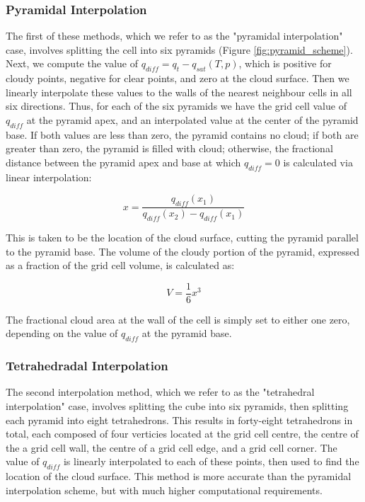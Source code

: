 \documentclass[12pt]{article}
\begin{document}
\subsubsection{Pyramidal Interpolation}

The first of these methods, which we refer to as the "pyramidal interpolation" 
case, involves splitting the cell into six pyramids  
(Figure \ref{fig:pyramid_scheme}).  Next, we compute the value of 
$q_{diff} = q_t - q_{sat}(T, p)$, which is positive for cloudy points, negative 
for clear points, and zero at the cloud surface.  Then we linearly interpolate 
these values to the walls of the nearest neighbour cells in all six directions. 
Thus, for each of the six pyramids we have the grid cell value of $q_{diff}$ at 
the pyramid apex, and an interpolated value at the center of the pyramid base.
If both values are less than zero, the pyramid contains no cloud; if both are 
greater than zero, the pyramid is filled with cloud; otherwise, the fractional 
distance between the pyramid apex and base at which $q_{diff} = 0$ is 
calculated via linear interpolation:

\begin{equation}
\label{eq:q_diff_interpolation}
x = \frac{q_{diff}(x_1)}{q_{diff}(x_2) - q_{diff}(x_1)}
\end{equation}

This is taken to be the location of the cloud surface, cutting the pyramid 
parallel to the pyramid base.  The volume of the cloudy portion of the pyramid,
expressed as a fraction of the grid cell volume, is calculated as:

\begin{equation}
V = \frac{1}{6}x^3
\end{equation}

The fractional cloud area at the wall of the cell is simply set to either one 
zero, depending on the value of $q_{diff}$ at the pyramid base.

\subsubsection{Tetrahedradal Interpolation}

The second interpolation method, which we refer to as the "tetrahedral 
interpolation" case, involves splitting the cube into six pyramids, then 
splitting each pyramid into eight tetrahedrons. This results in forty-eight 
tetrahedrons in total, each composed of four verticies located at the grid cell 
centre, the centre of the a grid cell wall, the centre of a grid cell edge, and 
a grid cell corner.  The value of $q_{diff}$ is linearly interpolated to each 
of these points, then used to find the location of the cloud surface.  This 
method is more accurate than the pyramidal interpolation scheme, but with 
much higher computational requirements.
\end{document}
